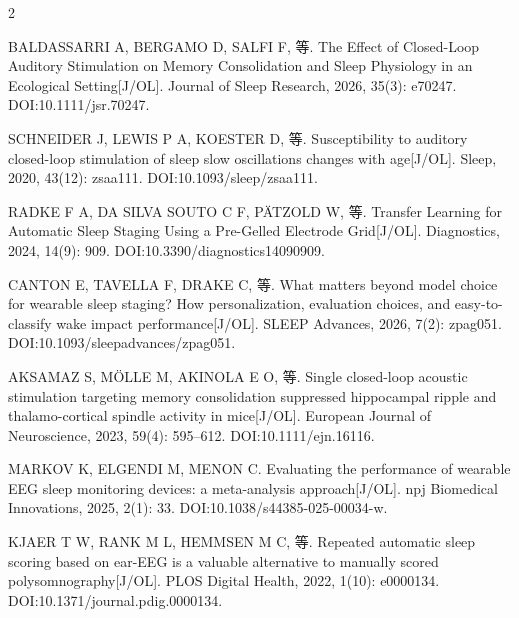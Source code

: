 \documentclass[UTF8,zihao=5,fontset=none]{ctexart}
\begin{document}
\begin{multicols}{2}
{\makebox[25.2pt][l]{[103]}BALDASSARRI A, BERGAMO D, SALFI F, 等. The Effect of Closed-Loop Auditory Stimulation on Memory Consolidation and Sleep Physiology in an Ecological Setting[J/OL]. Journal of Sleep Research, 2026, 35(3): e70247. DOI:10.1111/jsr.70247.\par
\makebox[25.2pt][l]{[104]}SCHNEIDER J, LEWIS P A, KOESTER D, 等. Susceptibility to auditory closed-loop stimulation of sleep slow oscillations changes with age[J/OL]. Sleep, 2020, 43(12): zsaa111. DOI:10.1093/sleep/zsaa111.\par
\makebox[25.2pt][l]{[105]}RADKE F A, DA SILVA SOUTO C F, PÄTZOLD W, 等. Transfer Learning for Automatic Sleep Staging Using a Pre-Gelled Electrode Grid[J/OL]. Diagnostics, 2024, 14(9): 909. DOI:10.3390/diagnostics14090909.\par
\makebox[25.2pt][l]{[106]}CANTON E, TAVELLA F, DRAKE C, 等. What matters beyond model choice for wearable sleep staging? How personalization, evaluation choices, and easy-to-classify wake impact performance[J/OL]. SLEEP Advances, 2026, 7(2): zpag051. DOI:10.1093/sleepadvances/zpag051.\par
\makebox[25.2pt][l]{[107]}AKSAMAZ S, MÖLLE M, AKINOLA E O, 等. Single closed-loop acoustic stimulation targeting memory consolidation suppressed hippocampal ripple and thalamo-cortical spindle activity in mice[J/OL]. European Journal of Neuroscience, 2023, 59(4): 595--612. DOI:10.1111/ejn.16116.\par
\makebox[25.2pt][l]{[108]}MARKOV K, ELGENDI M, MENON C. Evaluating the performance of wearable EEG sleep monitoring devices: a meta-analysis approach[J/OL]. npj Biomedical Innovations, 2025, 2(1): 33. DOI:10.1038/s44385-025-00034-w.\par
\makebox[25.2pt][l]{[109]}KJAER T W, RANK M L, HEMMSEN M C, 等. Repeated automatic sleep scoring based on ear-EEG is a valuable alternative to manually scored polysomnography[J/OL]. PLOS Digital Health, 2022, 1(10): e0000134. DOI:10.1371/journal.pdig.0000134.\par
}
\end{multicols}
\end{document}
